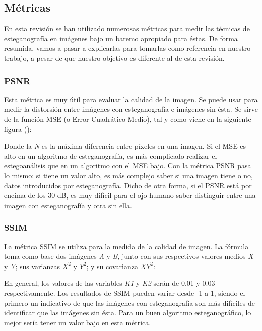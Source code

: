 \subsection{Métricas}

En esta revisión se han utilizado numerosas métricas para medir las técnicas de esteganografía en imágenes bajo un baremo apropiado para éstas. De forma resumida, vamos a pasar a explicarlas para tomarlas como referencia en nuestro trabajo, a pesar de que nuestro objetivo es diferente al de esta revisión.

\subsubsection{PSNR}

Esta métrica es muy útil para evaluar la calidad de la imagen. Se puede usar para medir la distorsión entre imágenes con esteganografía e imágenes sin ésta. Se sirve de la función \ac{MSE} (o Error Cuadrático Medio), tal y como viene en la siguiente figura (\cite{mse-ssim}): %




Donde la \textit{N} es la máxima diferencia entre píxeles en una imagen. Si el \ac{MSE} es alto en un algoritmo de esteganografía, es más complicado realizar el estegoanálisis que en un algoritmo con el \ac{MSE} bajo. Con la métrica \ac{PSNR} pasa lo mismo: si tiene un valor alto, es más complejo saber si una imagen tiene o no, datos introducidos por esteganografía. Dicho de otra forma, si el \ac{PSNR} está por encima de los 30 dB, es muy difícil para el ojo humano saber distinguir entre una imagen con esteganografía y otra sin ella.

\subsubsection{SSIM}

La métrica \ac{SSIM} se utiliza para la medida de la calidad de imagen. La fórmula toma como base dos imágenes \textit{A} y \textit{B}, junto con sus respectivos valores medios \textit{X} y \textit{Y}; sus varianzas $X^{2}$ y $Y^{2}$; y su covarianza $XY^{2}$:


En general, los valores de las variables \textit{K1} y \textit{K2} serán de 0.01 y 0.03 respectivamente. Los resultados de \ac{SSIM} pueden variar desde -1 a 1, siendo el primero un indicativo de que las imágenes con esteganografía son más difíciles de identificar que las imágenes sin ésta. Para un buen algoritmo esteganográfico, lo mejor sería tener un valor bajo en esta métrica.

